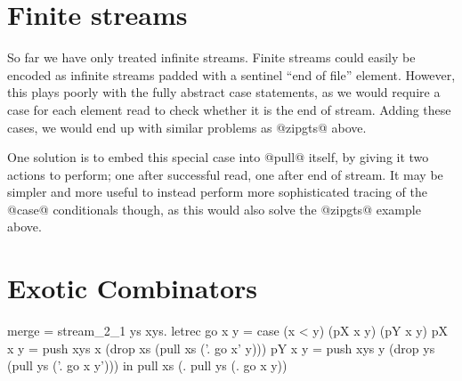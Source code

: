 \section{Finite streams}
So far we have only treated infinite streams.
Finite streams could easily be encoded as infinite streams padded with a sentinel ``end of file'' element.
However, this plays poorly with the fully abstract case statements, as we would require a case for each element read to check whether it is the end of stream.
Adding these cases, we would end up with similar problems as @zipgts@ above.

One solution is to embed this special case into @pull@ itself, by giving it two actions to perform; one after successful read, one after end of stream.
It may be simpler and more useful to instead perform more sophisticated tracing of the @case@ conditionals though, as this would also solve the @zipgts@ example above.



\appendix
\section{Exotic Combinators}
\label{s:Combinators:Exotic}

\begin{code}
merge = stream_2_1 \xs ys xys.
  letrec
    go x y = case (x < y)
             (pX x y)
             (pY x y)
    pX x y = push xys x
            (drop xs
            (pull xs (\x'. go x' y)))
    pY x y = push xys y
            (drop ys
            (pull ys (\y'. go x y')))
  in pull xs (\x. pull ys (\y. go x y))
\end{code}


